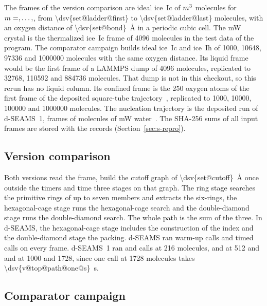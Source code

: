 \documentclass[preprint,12pt]{elsarticle}
\begin{document}
The frames of the version comparison are ideal ice~Ic of $\dsv{set@cellsites}m^3$ molecules for $m=\dsv{set@cells@first},\dots,\dsv{set@cells@last}$, from \num{\dsv{set@ladder@first}} to \num{\dsv{set@ladder@last}} molecules, with an oxygen distance of \qty{\dsv{set@bond}}{\angstrom} in a periodic cubic cell.
The mW crystal is the thermalized ice~Ic frame of \num{4096} molecules in the test data of the program.
The comparator campaign builds ideal ice~Ic and ice~Ih of \num{1000}, \num{10648}, \num{97336} and \num{1000000} molecules with the same oxygen distance.
Its liquid frame would be the first frame of a LAMMPS dump of \num{4096} molecules, replicated to \num{32768}, \num{110592} and \num{884736} molecules.
That dump is not in this checkout, so this rerun has no liquid column.
Its confined frame is the \num{250} oxygen atoms of the first frame of the deposited square-tube trajectory~\cite{goswami2019nanotubedata}, replicated to \num{1000}, \num{10000}, \num{100000} and \num{1000000} molecules.
The nucleation trajectory is the deposited run of d-SEAMS~1,  frames of  molecules of mW water~\cite{goswami2019nucleationdata,molinero2009mw}.
The SHA-256 sums of all input frames are stored with the records (Section~\ref{sec:s-repro}).

\subsection{Version comparison}
\label{sec:s-versions}

Both versions read the frame, build the cutoff graph of \qty{\dsv{set@cutoff}}{\angstrom} once outside the timers and time three stages on that graph.
The ring stage searches the primitive rings of up to seven members and extracts the six-rings, the hexagonal-cage stage runs the hexagonal-cage search and the double-diamond stage runs the double-diamond search.
The whole path is the sum of the three.
In d-SEAMS, the hexagonal-cage stage includes the construction of the index and the double-diamond stage the packing.
d-SEAMS ran  warm-up calls and  timed calls on every frame.
d-SEAMS~1 ran  and  calls at \num{216} molecules,  and  at \num{512} and  and  at \num{1000} and \num{1728}, since one call at \num{1728} molecules takes \qty{\dsv{v@top@path@one@s}}{\second}.

\subsection{Comparator campaign}
\label{sec:s-campaign}
\end{document}
